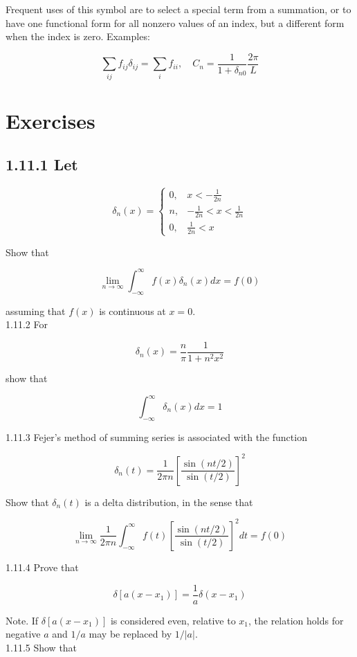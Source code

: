 \documentclass[10pt]{article}
\begin{document}
Frequent uses of this symbol are to select a special term from a summation, or to have one functional form for all nonzero values of an index, but a different form when the index is zero. Examples:

$$
\sum_{i j} f_{i j} \delta_{i j}=\sum_{i} f_{i i}, \quad C_{n}=\frac{1}{1+\delta_{n 0}} \frac{2 \pi}{L}
$$

\section*{Exercises}
\subsection*{1.11.1 Let}
$$
\delta_{n}(x)= \begin{cases}0, & x<-\frac{1}{2 n} \\ n, & -\frac{1}{2 n}<x<\frac{1}{2 n} \\ 0, & \frac{1}{2 n}<x\end{cases}
$$

Show that

$$
\lim _{n \rightarrow \infty} \int_{-\infty}^{\infty} f(x) \delta_{n}(x) d x=f(0)
$$

assuming that $f(x)$ is continuous at $x=0$.\\
1.11.2 For

$$
\delta_{n}(x)=\frac{n}{\pi} \frac{1}{1+n^{2} x^{2}}
$$

show that

$$
\int_{-\infty}^{\infty} \delta_{n}(x) d x=1
$$

1.11.3 Fejer's method of summing series is associated with the function

$$
\delta_{n}(t)=\frac{1}{2 \pi n}\left[\frac{\sin (n t / 2)}{\sin (t / 2)}\right]^{2}
$$

Show that $\delta_{n}(t)$ is a delta distribution, in the sense that

$$
\lim _{n \rightarrow \infty} \frac{1}{2 \pi n} \int_{-\infty}^{\infty} f(t)\left[\frac{\sin (n t / 2)}{\sin (t / 2)}\right]^{2} d t=f(0)
$$

1.11.4 Prove that

$$
\delta\left[a\left(x-x_{1}\right)\right]=\frac{1}{a} \delta\left(x-x_{1}\right)
$$

Note. If $\delta\left[a\left(x-x_{1}\right)\right]$ is considered even, relative to $x_{1}$, the relation holds for negative $a$ and $1 / a$ may be replaced by $1 /|a|$.\\
1.11.5 Show that
\end{document}
